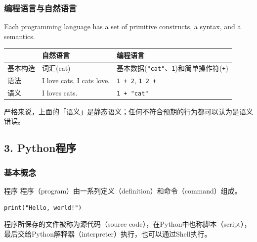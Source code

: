 \documentclass[aspectratio=169, 14pt]{beamer}
\begin{document}
\begin{frame}
	\frametitle{编程语言与自然语言}
	Each programming language has a set of primitive constructs, a syntax, and a semantics.

	\begin{tabular}{l l p{2in}}
		\toprule
		     & \textbf{自然语言}                     & \textbf{编程语言}                                       \\
		\midrule
		基本构造 & 词汇(cat)                           & 基本数据(\texttt{"cat"}、\texttt{1})和简单操作符({\texttt{+}}) \\
		语法   & I love cats. \alert{I cats love}. & \texttt{1 + 2}, \alert{\texttt{1 2 +}}              \\
		语义   & \alert{I loves cats}.             & \texttt{1 + "cat"}                                  \\
		\bottomrule
	\end{tabular}

	严格来说，上面的「语义」是\alert{静态语义}；任何不符合预期的行为都可以认为是语义错误。
\end{frame}

{
\begin{frame}
	\section{\textcolor{darkmidnightblue}{3. Python程序}}
\end{frame}
}

\begin{frame}[fragile]
	\frametitle{基本概念}
	\begin{exampleblock}{程序}
		程序（program）由一系列定义（definition）和命令（command）组成。
	\end{exampleblock}

	\begin{verbatim}
print("Hello, world!")
  \end{verbatim}

	程序所保存的文件被称为\alert{源代码}（source code），在Python中也称\alert{脚本}（script），最后交给Python\alert{解释器}（interpreter）执行，也可以通过Shell执行。
\end{frame}
\end{document}
